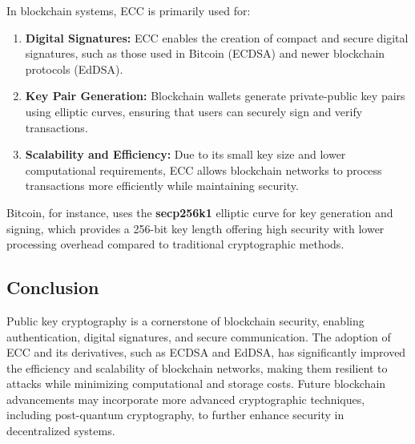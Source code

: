 \documentclass{article}
\begin{document}
In blockchain systems, ECC is primarily used for:
\begin{enumerate}
    \item \textbf{Digital Signatures:} ECC enables the creation of compact and secure digital signatures, such as those used in Bitcoin (ECDSA) and newer blockchain protocols (EdDSA).
    \item \textbf{Key Pair Generation:} Blockchain wallets generate private-public key pairs using elliptic curves, ensuring that users can securely sign and verify transactions.
    \item \textbf{Scalability and Efficiency:} Due to its small key size and lower computational requirements, ECC allows blockchain networks to process transactions more efficiently while maintaining security.
\end{enumerate}

Bitcoin, for instance, uses the \textbf{secp256k1} elliptic curve for key generation and signing, which provides a 256-bit key length offering high security with lower processing overhead compared to traditional cryptographic methods.

\subsection*{Conclusion}
Public key cryptography is a cornerstone of blockchain security, enabling authentication, digital signatures, and secure communication. The adoption of ECC and its derivatives, such as ECDSA and EdDSA, has significantly improved the efficiency and scalability of blockchain networks, making them resilient to attacks while minimizing computational and storage costs. Future blockchain advancements may incorporate more advanced cryptographic techniques, including post-quantum cryptography, to further enhance security in decentralized systems.





\end{document}
